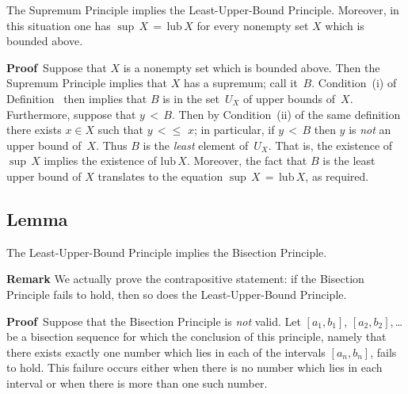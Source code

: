 \V

        The Supremum Principle implies the Least-Upper-Bound Principle. Moreover, in this situation one has ${\sup}\,X \,=\, \mbox{lub}\,X$ for every nonempty set $X$ which is bounded above.

\V

        {\bf Proof}\, Suppose that $X$ is a nonempty set which is bounded above. Then the Supremum Principle implies that $X$ has a supremum; call it~$B$. 
    Condition~(i) of Definition~ then implies that $B$ is in the set~$U_{X}$ of upper bounds of~$X$.
    Furthermore, suppose that $y\,<\,B$. Then by Condition~(ii) of the same definition there exists $x{\in}X$ such that $y\,<{\leq}\,\,x$;
    in particular, if $y\,<\,B$ then $y$ is {\em not} an upper bound of~$X$. Thus $B$ is the {\em least} element of~$U_{X}$.
    That is, the existence of ${\sup}\,X$ implies the existence of $\mbox{lub}\,X$.
    Moreover, the fact that $B$ is the least upper bound of $X$ translates to the equation ${\sup}\,X \,=\, \mbox{lub}\,X$, as required.


\V

            \subsection{\small{Lemma}}
            \label{LemmaB30.08CCC}

\V

        The Least-Upper-Bound Principle implies the Bisection Principle.

\V

        {\bf Remark} We actually prove the contrapositive statement: if the Bisection Principle fails to hold, then so does the Least-Upper-Bound Principle.

\V

        {\bf Proof}\, Suppose that the Bisection Principle is {\em not} valid. Let $[a_{1},b_{1}]$, $[a_{2},b_{2}]$,\,{\ldots}\, be a bisection sequence
    for which the conclusion of this principle, namely that there exists exactly one number which lies in each of the intervals $[a_{n},b_{n}]$, fails to hold.
    This failure occurs either when there is no number which lies in each interval or when there is more than one such number.

\VA

